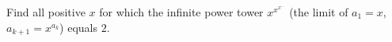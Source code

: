 Find all positive $x$ for which the infinite power tower $x^{x^{x^{\cdots}}}$ (the limit of $a_1=x$, $a_{k+1}=x^{a_k}$) equals $2$.
